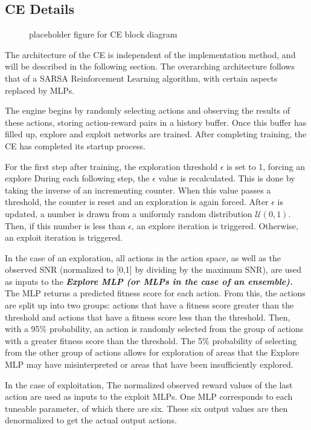 \subsection{CE Details}
\begin{figure}
\caption{placeholder figure for CE block diagram}
\end{figure}
\par The architecture of the CE is independent of the implementation method, and will be described in the following section. The overarching architecture follows that of a SARSA Reinforcement Learning algorithm, with certain aspects replaced by MLPs. 
\par The engine begins by randomly selecting actions and observing the results of these actions, storing action-reward pairs in a history buffer. Once this buffer has filled up, explore and exploit networks are trained. After completing training, the CE has completed its startup process.
\par For the first step after training, the exploration threshold $\epsilon$ is set to 1, forcing an explore During each following step, the $\epsilon$ value is recalculated. This is done by taking the inverse of an incrementing counter. When this value passes a threshold, the counter is reset and an exploration is again forced. After $\epsilon$ is updated, a number is drawn from a uniformly random distribution $\mathcal{U}(0,1)$. Then, if this number is less than $\epsilon$, an explore iteration is triggered. Otherwise, an exploit iteration is triggered.
\par In the case of an exploration, all actions in the action space, as well as the observed SNR (normalized to [0,1] by dividing by the maximum SNR), are used as inputs to the \textit{\textbf{Explore MLP (or MLPs in the case of an ensemble).}} The MLP returns a predicted fitness score for each action. From this, the actions are split up into two groups: actions that have a fitness score greater than the threshold and actions that have a fitness score less than the threshold. Then, with a 95\% probability, an action is randomly selected from the group of actions with a greater fitness score than the threshold. The 5\% probability of selecting from the other group of actions allows for exploration of areas that the Explore MLP may have misinterpreted or areas that have been insufficiently explored.
\par In the case of exploitation, The normalized observed reward values of the last action are used as inputs to the exploit MLPs. One MLP corresponds to each tuneable parameter, of which there are six. These six output values are then denormalized to get the actual output actions.
